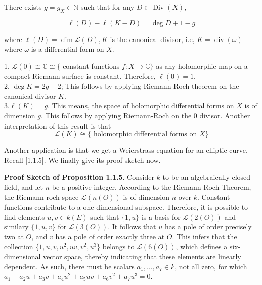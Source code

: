 \begin{theorem}
    There exists $g=g_{X} \in \mathbb{N}$ such that for any $D \in \operatorname{Div}(X)$,

$$
\ell(D)-\ell(K-D)=\operatorname{deg} D+1-g
$$

where $\ell(D)=\operatorname{dim} \mathscr{L}(D), K$ is the canonical divisor, i.e, $K=\operatorname{div}(\omega)$ where $\omega$ is a differential form on $X$.

\end{theorem}

\begin{remark}
 1. $\mathscr{L}(0) \cong \mathbb{C} \cong\{$ constant functions $f: X \longrightarrow \mathbb{C}\}$ as any holomorphic map on a compact Riemann surface is constant. Therefore, $\ell(0)=1$.\\
2. $\operatorname{deg} K=2 g-2$; This follows by applying Riemann-Roch theorem on the canonical divisor $K$. \\
3.$\ell(K)=g$. This means, the space of holomorphic differential forms on $X$ is of dimension $g$. This follows by applying Riemann-Roch on the 0 divisor. Another interpretation of this result is that $$\mathscr{L}(K)\cong\{\text { holomorphic differential forms on } X\}$$
  
\end{remark}

Another application is that we get a Weierstrass equation for an elliptic curve. Recall \ref{1.1.5}. We finally give its proof sketch now. 


\textbf{Proof Sketch of Proposition 1.1.5}.
Consider \( k \) to be an algebraically closed field, and let \( n \) be a positive integer. According to the Riemann-Roch Theorem, the Riemann-roch space \( \mathscr{L}(n(O)) \) is of dimension \( n \) over \( k \). Constant functions contribute to a one-dimensional subspace. Therefore, it is possible to find elements \( u, v \in k(E) \) such that \( \{1, u\} \) is a basis for \( \mathscr{L}(2(O)) \) and similary \( \{1, u, v\} \) for \( \mathscr{L}(3(O)) \). It follows that \( u \) has a pole of order precisely two at \( O \), and \( v \) has a pole of order exactly three at \( O \). This infers that the collection \( \{1, u, v, u^2, uv, v^2, u^3\} \) belongs to \( \mathscr{L}(6(O)) \), which defines a six-dimensional vector space, thereby indicating that these elements are linearly dependent. As such, there must be scalars \( a_{1}, \ldots, a_{7} \in k \), not all zero, for which \( a_{1} + a_{2} u + a_{3} v + a_{4} u^2 + a_{5} uv + a_{6} v^2 + a_{7} u^3 = 0 \).

